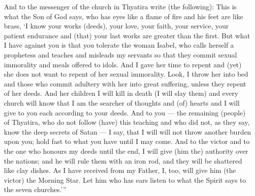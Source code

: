 \begin{pages}
\begin{Leftside}
		\pend
		\pstart
			And to the messenger of the church in Thyatira write (the following): This is what the Son of God says, who has eyes like a flame of fire and his feet are like brass, ‘I know your works (deeds), your love, your faith, your service, your patient endurance and (that) your last works are greater than the first.
		\pend
		\pstart
			But what I have against you is that you tolerate the woman Isabel, who calls herself a prophetess and teaches and misleads my servants so that they commit sexual immorality and meals offered to idols. And I gave her time to repent and (yet) she does not want to repent of her sexual immorality. 
		\pend	
		\pstart
			Look, I throw her into bed and those who commit adultery with her into great suffering, unless they repent of her deeds. And her children I will kill in death (I will slay them) and every church will know that I am the searcher of thoughts and (of) hearts and I will give to you each according to your deeds. And to you — the remaining (people) of Thyatira, who do not follow (have) this teaching and who did not, as they say, know the deep secrets of Satan — I say, that I will will not throw another burden upon you; hold fast to what you have until I may come. And to the victor and to the one who honours my deeds until the end, I will give (him the) authority over the nations; and he will rule them with an iron rod, and they will be shattered like clay dishes. As I have received from my Father, I, too, will give him (the victor) the Morning Star. Let him who has ears listen to what the Spirit says to the seven churches.’”
		\pend
        \endnumbering
    \end{Leftside}

\end{pages} 
\Pages
